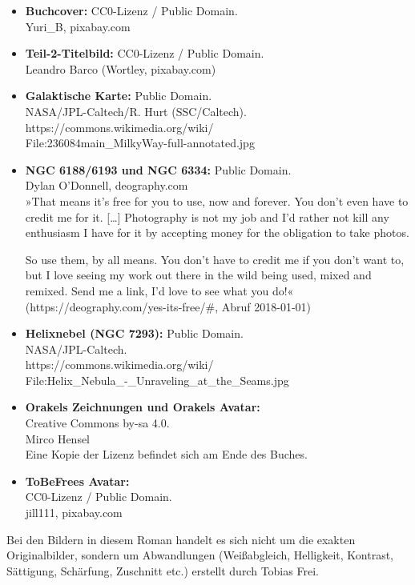\begin{itemize}
	\item \textbf{Buchcover:} CC0-Lizenz / Public Domain.\\ Yuri\_B, pixabay.com
	\item \textbf{Teil-2-Titelbild:} CC0-Lizenz / Public Domain.\\ Leandro Barco (Wortley, pixabay.com)
	\item \textbf{Galaktische Karte:} Public Domain.\\ NASA/JPL-Caltech/R. Hurt (SSC/Caltech).\\ https://commons.wikimedia.org/wiki/\\File:236084main\_MilkyWay-full-annotated.jpg
	\item \textbf{NGC 6188/6193 und NGC 6334:} Public Domain.\\ Dylan O'Donnell, deography.com\\ »That means it’s free for you to use, now and forever. You don’t even have to credit me for it. […] Photography is not my job and I’d rather not kill any enthusiasm I have for it by accepting money for the obligation to take photos.

So use them, by all means. You don’t have to credit me if you don’t want to, but I love seeing my work out there in the wild being used, mixed and remixed. Send me a link, I’d love to see what you do!« (https://deography.com/yes-its-free/\#, Abruf 2018-01-01)
	\item \textbf{Helixnebel (NGC 7293):} Public Domain.\\ NASA/JPL-Caltech.\\https://commons.wikimedia.org/wiki/\\File:Helix\_Nebula\_-\_Unraveling\_at\_the\_Seams.jpg
	\item \textbf{Orakels Zeichnungen und Orakels Avatar:}\\ Creative Commons by-sa 4.0.\\ Mirco Hensel\\Eine Kopie der Lizenz befindet sich am Ende des Buches.
	\item \textbf{ToBeFrees Avatar:}\\ CC0-Lizenz / Public Domain.\\ jill111, pixabay.com
\end{itemize}

Bei den Bildern in diesem Roman handelt es sich nicht um die exakten Originalbilder, sondern um Abwandlungen (Weißabgleich, Helligkeit, Kontrast, Sättigung, Schärfung, Zuschnitt etc.) erstellt durch Tobias Frei.

